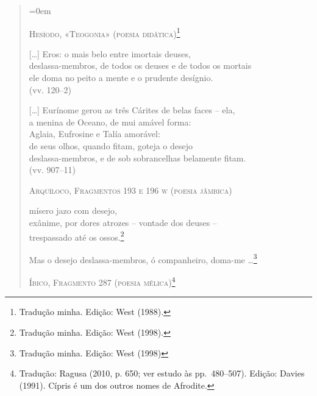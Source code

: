 \begin{quote} \parindent=0em
{\centering
\textsc{Hesíodo, «Teogonia» (poesia didática)\footnote{Tradução minha. Edição: West (1988).}}
\par}

\smallskip

	[\ldots{}] Eros: o mais belo entre imortais deuses,\\
	deslassa-membros, de todos os deuses e de todos os mortais\\
	ele doma no peito a mente e o prudente desígnio.\\
	\mbox{}\hfill (vv. 120--2)

\smallskip
[\ldots{}] Eurínome gerou as três Cárites de belas faces -- ela,\\
\hspace*{2em}a menina de Oceano, de mui amável forma:\\
\hspace*{2em}Aglaia, Eufrosine e Talía amorável:\\
\hspace*{2em}de seus olhos, quando fitam, goteja o desejo\\
\hspace*{2em}deslassa-membros, e de sob sobrancelhas belamente fitam.\\
\mbox{}\hfill (vv. 907--11)

 \bigskip

 {\centering
 \textsc{Arquíloco, Fragmentos 193 e 196 \textsc{w} (poesia jâmbica)}
 \par}

 \smallskip

 	\hspace*{4.5em}mísero jazo com desejo,\\
 	\hspace*{2em}exânime, por dores atrozes -- vontade dos deuses --\\
 	\hspace*{4.5em}trespassado até os ossos.\footnote{ Tradução minha. Edição: West (1998).}

 \smallskip

 	Mas o desejo deslassa-membros, ó companheiro, doma-me
 	\ldots{}\footnote{ Tradução minha. Edição: West (1998)}

\bigskip

{\centering
\textsc{Íbico, Fragmento 287 (poesia mélica)\footnote{ Tradução: Ragusa (2010, p.
650; ver estudo às pp.~480--507). Edição: Davies (1991). Cípris é um dos outros nomes de Afrodite.}}
\par}


\end{quote}
